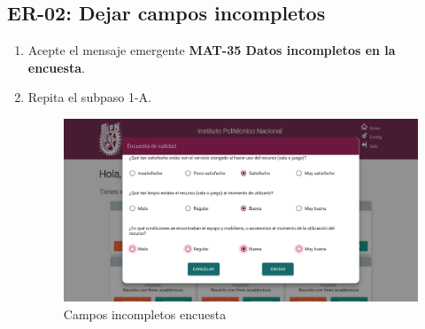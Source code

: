   \subsection{ER-02: Dejar campos incompletos}
\begin{enumerate}
	\item Acepte el mensaje emergente \textbf{MAT-35 Datos incompletos en la encuesta}.
	\item Repita el subpaso 1-A.
	 \begin{figure}[hbtp]
	\includegraphics[scale=0.3]{images/Interfaz/Errores Encuesta.png}
	\caption{Campos incompletos encuesta}
	\end{figure}
\end{enumerate}
